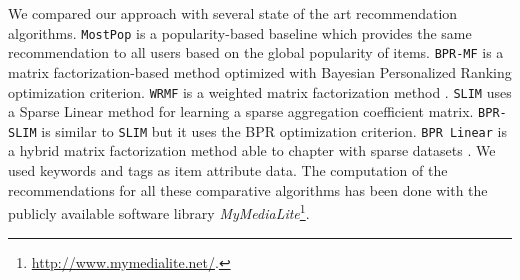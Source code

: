 We compared our approach with several state of the art recommendation algorithms. 
\texttt{MostPop} is a popularity-based baseline which provides the same recommendation to all users based on the global popularity of items. 
\texttt{BPR-MF} \citep{RendleFGS09} is a matrix factorization-based method optimized with Bayesian Personalized Ranking optimization criterion.
\texttt{WRMF} is a weighted matrix factorization method \citep{Hu2008}.
\texttt{SLIM} \citep{Ning2012} uses a Sparse Linear method for learning a sparse aggregation coefficient matrix.
\texttt{BPR-SLIM} is similar to \texttt{SLIM} but it uses the BPR optimization criterion.
\texttt{BPR Linear} is a hybrid matrix factorization method able to chapter with sparse datasets \citep{GantnerDFRS10}. We used keywords and tags as item attribute data. 
The computation of the recommendations for all these comparative algorithms has been done with the publicly available software library \textit{MyMediaLite}\footnote{\url{http://www.mymedialite.net/}.}.

